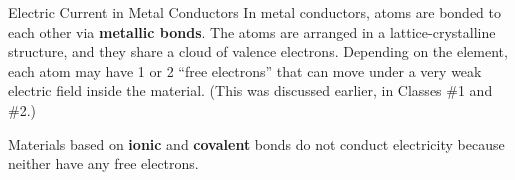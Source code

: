 \documentclass[12pt,aspectratio=169]{beamer}
\begin{document}
\begin{frame}{Electric Current in Metal Conductors}
  In metal conductors, atoms are bonded to each other via
  \textbf{metallic bonds}. The atoms are arranged in a lattice-crystalline
  structure, and they share a cloud of valence electrons. Depending on the
  element, each atom may have 1 or 2 ``free electrons'' that can move under a
  very weak electric field inside the material. (This was discussed earlier, in
  Classes \#1 and \#2.)
  \begin{center}
  \end{center}
  Materials based on \textbf{ionic} and \textbf{covalent} bonds do not conduct
  electricity because neither have any free electrons.
\end{frame}
\end{document}
